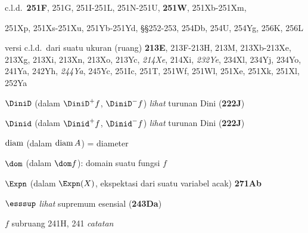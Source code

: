 c.l.d.\ {\bf 251F}, 251G,
251I-251L, 
251N-251U, 
{\bf 251W}, 251Xb-251Xm, 
  
251Xp, 251Xs-251Xu, 
251Yb-251Yd, 
\S\S252-253, 254Db, 254U, 254Yg, 256K, 256L


versi c.l.d.\ dari suatu ukuran (ruang) {\bf 213E},
213F-213H, 
213M, 213Xb-213Xe, 
213Xg, 213Xi, 213Xn, 213Xo, 213Yc, {\it 214Xe}, 214Xi, {\it 232Ye},
234Xl, 234Yj, 234Yo, 241Ya, 242Yh, {\it 244Ya},
245Yc, 251Ic, 251T, 251Wf, 251Wl,
251Xe, 251Xk, 251Xl, 252Ya










\indexmedskip
{}









$\DiniD$ (dalam $\DiniD^+f$, $\DiniD^-f$) {\it lihat} turunan Dini
({\bf 222J})


$\Dinid$ (dalam $\Dinid^+f$, $\Dinid^-f$) {\it lihat} turunan Dini
({\bf 222J})














$\mathop{\text{diam}}$ (dalam $\mathop{\text{diam}} A$) = diameter



$\dom$ (dalam $\dom f$):  domain suatu fungsi $f$

\indexmedskip
{}

$\Expn$ (dalam $\Expn(X)$, ekspektasi dari suatu variabel acak)
{\bf 271Ab}



$\esssup$ {\it lihat} supremum esensial ({\bf 243Da})




\indexmedskip
{}





















$f$ subruang 241H, 241 {\it catatan\/}


